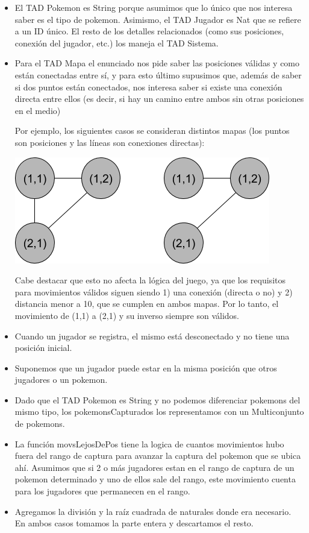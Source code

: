 \renewcommand{\labelitemi}{\textbullet}
\begin{itemize}

\item El TAD Pokemon es String porque asumimos que lo \'unico que nos interesa saber es el tipo de pokemon. Asimismo, el TAD Jugador es Nat que se refiere a un ID \'unico. El resto de los detalles relacionados (como sus posiciones, conexi\'on del jugador, etc.) los maneja el TAD Sistema.

\item Para el TAD Mapa el enunciado nos pide saber las posiciones v\'alidas y como est\'an conectadas entre s\'i, y para esto \'ultimo supusimos que, adem\'as de saber si dos puntos est\'an conectados, nos interesa saber si existe una conexi\'on directa entre ellos (es decir, si hay un camino entre ambos sin otras posiciones en el medio)

Por ejemplo, los siguientes casos se consideran distintos mapas (los puntos son posiciones y las l\'ineas son conexiones directas):

\bigskip
\centerline{\includegraphics[scale=0.5]{nodos-mapa.png}}

Cabe destacar que esto no afecta la l\'ogica del juego, ya que los requisitos para movimientos v\'alidos siguen siendo 1) una conexi\'on (directa o no) y 2) distancia menor a 10, que se cumplen en ambos mapas. Por lo tanto, el movimiento de (1,1) a (2,1) y su inverso siempre son v\'alidos.

\item Cuando un jugador se registra, el mismo est\'a desconectado y no tiene una posici\'on inicial.

\item Suponemos que un jugador puede estar en la misma posici\'on que otros jugadores o un pokemon.

\item Dado que el TAD Pokemon es String y no podemos diferenciar pokemons del mismo tipo, los pokemonsCapturados los representamos con un Multiconjunto de pokemons.

\item La funci\'on movsLejosDePos tiene la logica de cuantos movimientos hubo fuera del rango de captura para avanzar la captura del pokemon que se ubica ah\'i. Asumimos que si 2 o m\'as jugadores estan en el rango de captura de un pokemon determinado y uno de ellos sale del rango, este movimiento cuenta para los jugadores que permanecen en el rango.

\item Agregamos la divisi\'on y la ra\'iz cuadrada de naturales donde era necesario. En ambos casos tomamos la parte entera y descartamos el resto.

\end{itemize}